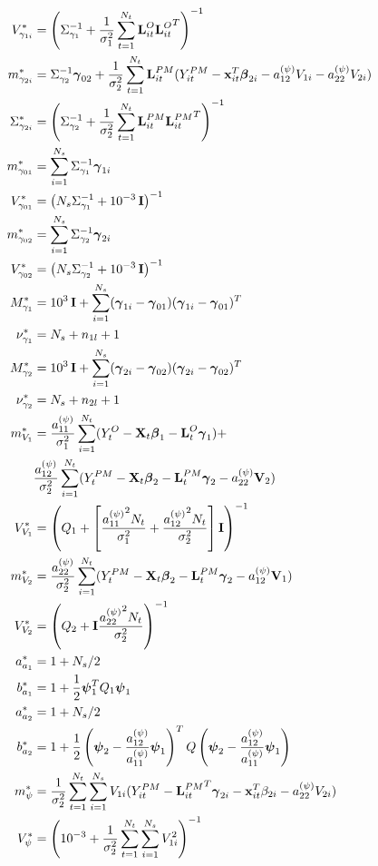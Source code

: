 \documentclass[alpha-refs]{wiley-article}
\newcommand{\bbeta}{ \mbox{\boldmath $ \beta $} }
\newcommand{\bpsi}{ \mbox{\boldmath $\psi$} }
\newcommand{\bgamma}{ \mbox{\boldmath $\gamma$} }
\newcommand{\bI}{\textbf{I}}
\newcommand{\bL}{\textbf{L}}
\newcommand{\bV}{\textbf{V}}
\newcommand{\bx}{\textbf{x}}
\newcommand{\bX}{\textbf{X}}
\begin{document}
{\begin{align*}
V_{\gamma_{1i} }^* &= \left( \Sigma_{\gamma_1}^{-1} + \frac{1}{\sigma_1^2} \sum^{N_t}_{t=1} {\bL^{O}_{it}} {\bL^{O}_{it}}^T  \right)^{-1} \\
m_{\gamma_{2i} }^* &= \Sigma_{\gamma_2}^{-1} \bgamma_{02} + \frac{1}{\sigma^2_2} \sum^{N_t}_{t=1} {\bL^{PM}_{it}} (Y^{PM}_{it} - \bx_{it}^T\bbeta_{2i} - a_{12}^{(\psi)} V_{1i}- a_{22}^{(\psi)} V_{2i} )   \\
\Sigma_{\gamma_{2i} }^* &= \left( \Sigma_{\gamma_2}^{-1} + \frac{1}{\sigma_2^2} \sum^{N_t}_{t=1} {\bL^{PM}_{it}} {\bL^{PM}_{it}}^T  \right)^{-1} \\
m_{\gamma_{01} }^* &=  \sum_{i=1}^{N_s}  \Sigma_{\gamma_1}^{-1} \bgamma_{1i} \\
V_{\gamma_{01} }^* &= \left( N_s \Sigma_{\gamma_1}^{-1}  +10^{-3} \, \bI \right)^{-1} \\
m_{\gamma_{02} }^* &=  \sum_{i=1}^{N_s}  \Sigma_{\gamma_2}^{-1} \bgamma_{2i}  \\
V_{\gamma_{02} }^* &= \left( N_s \Sigma_{\gamma_2}^{-1}  + 10^{-3} \, \bI \right)^{-1}  \\
M_{\gamma_1}^* &=10^{3} \, \bI + \sum_{i=1}^{N_s} (\bgamma_{1i} - \bgamma_{01}) (\bgamma_{1i} - \bgamma_{01})^T \\
\nu_{\gamma_1}^* &= N_s + n_{1l} + 1 \\
M_{\gamma_2}^* &= 10^{3} \, \bI + \sum_{i=1}^{N_s} (\bgamma_{2i} - \bgamma_{02}) (\bgamma_{2i} - \bgamma_{02})^T \\
\nu_{\gamma_2}^* &= N_s + n_{2l} + 1 \\
m_{V_1}^* &= \frac{a_{11}^{(\psi)} }{\sigma^2_1} \sum_{i=1}^{N_t} (Y_t^{O} - \bX_t \bbeta_1- \bL^{O}_t\bgamma_{1} ) + \\ & \frac{a_{12}^{(\psi)} }{\sigma^2_2} \sum_{i=1}^{N_t} (Y_{t}^{PM} - \bX_t \bbeta_2- \bL^{PM}_t\bgamma_{2}- a_{22}^{(\psi)} \bV_2  )  \\
V_{V_1}^* &= \left( Q_1 + \left[\frac{{a_{11}^{(\psi)}}^2 N_t }{\sigma^2_1} + \frac{{a_{12}^{(\psi)}}^2 N_t }{\sigma^2_2} \right] \bI \right)^{-1} \\
m_{V_2}^* &= \frac{a_{22}^{(\psi)} }{\sigma^2_2} \sum_{i=1}^{N_t} (Y_t^{PM} - \bX_t \bbeta_2-\bL^{PM}_t\bgamma_{2}- a_{12}^{(\psi)} \bV_1 ) \\
V_{V_2}^* &= \left( Q_2  + \bI \frac{{a_{22}^{(\psi)}}^2 N_t }{\sigma^2_2} \right)^{-1} \\
a^*_{a_1} &= 1 + N_s /2  \\
b^*_{a_1} &= 1 + \frac{1}{2} \bpsi_1^T Q_1 \bpsi_1 \\
a^*_{a_2} &= 1 + N_s /2   \\
b^*_{a_2} &= 1+ \frac{1}{2} \left(\bpsi_2 - \frac{a_{12}^{(\psi)}}{a_{11}^{(\psi)}} \bpsi_1 \right)^T Q \left(\bpsi_2 - \frac{a_{12}^{(\psi)}}{a_{11}^{(\psi)}} \bpsi_1 \right) \\
 m_{\psi}^* &= \frac{1}{\sigma^2_2} \sum^{N_t}_{t=1} \sum^{N_s}_{i=1} V_{1i} (Y^{PM}_{it} - {\bL^{PM}_{it}}^T\bgamma_{2i}- \bx_{it}^T \beta_{2i} - a^{(\psi)}_{22} V_{2i}  )\\
V_{\psi}^* &= \left( 10^{-3} + \frac{1}{\sigma^2_2} \sum^{N_t}_{t=1} \sum^{N_s}_{i=1} V_{1i}^2 \right)^{-1}
\end{align*}
}
\end{document}
